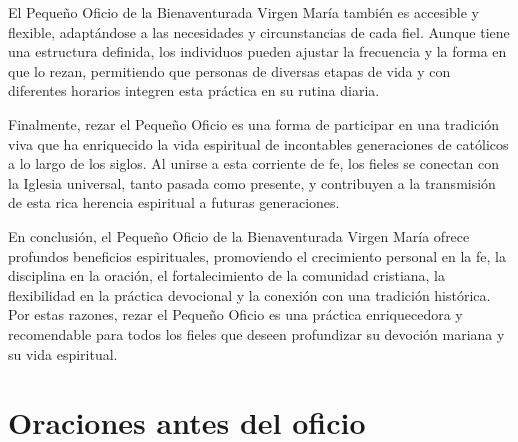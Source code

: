 \documentclass[12pt,a5paper,openright]{memoir}
\begin{document}
El Pequeño Oficio de la Bienaventurada Virgen María también es accesible y flexible, adaptándose a las necesidades y circunstancias de cada fiel. Aunque tiene una estructura definida, los individuos pueden ajustar la frecuencia y la forma en que lo rezan, permitiendo que personas de diversas etapas de vida y con diferentes horarios integren esta práctica en su rutina diaria.

Finalmente, rezar el Pequeño Oficio es una forma de participar en una tradición viva que ha enriquecido la vida espiritual de incontables generaciones de católicos a lo largo de los siglos. Al unirse a esta corriente de fe, los fieles se conectan con la Iglesia universal, tanto pasada como presente, y contribuyen a la transmisión de esta rica herencia espiritual a futuras generaciones.

En conclusión, el Pequeño Oficio de la Bienaventurada Virgen María ofrece profundos beneficios espirituales, promoviendo el crecimiento personal en la fe, la disciplina en la oración, el fortalecimiento de la comunidad cristiana, la flexibilidad en la práctica devocional y la conexión con una tradición histórica. Por estas razones, rezar el Pequeño Oficio es una práctica enriquecedora y recomendable para todos los fieles que deseen profundizar su devoción mariana y su vida espiritual.



\cleardoublepage

\renewcommand{\thepage}{\arabic{page}}

\setcounter{page}{1}

\chapter*{Oraciones antes del oficio}



\medskip

\startParallel

\end{document}
